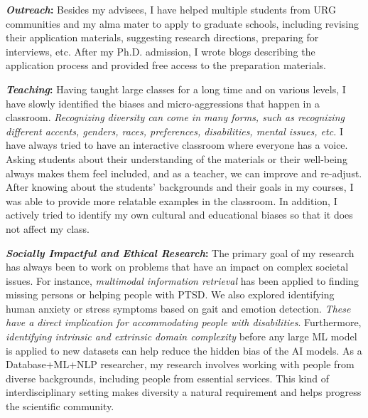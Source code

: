 \documentclass[10pt]{article}
\newcommand*\heading[1]{\textbf{\textit{#1}:}}
\begin{document}
\heading{Outreach} Besides my advisees, I have helped multiple students from URG communities and my alma mater to apply to graduate schools, including revising their application materials, suggesting research directions, preparing for interviews, etc. After my Ph.D. admission, I wrote blogs describing the application process and provided free access to the preparation materials.

\heading{Teaching}
Having taught large classes for a long time and on various levels, I have slowly identified the biases and micro-aggressions that happen in a classroom. 
\textit{Recognizing diversity can come in many forms, such as recognizing different accents, genders, races, preferences, disabilities, mental issues, etc.} I have always tried to have an interactive classroom where everyone has a voice. Asking students about their understanding of the materials or their well-being always makes them feel included, and as a teacher, we can improve and re-adjust. After knowing about the students' backgrounds and their goals in my courses, I was able to provide more relatable examples in the classroom. In addition, I actively tried to identify my own cultural and educational biases so that it does not affect my class.

\heading{Socially Impactful and Ethical Research} 
The primary goal of my research has always been to work on problems that have an impact on complex societal issues. For instance, \textit{multimodal information retrieval} has been applied to finding missing persons or helping people with PTSD. 
We also explored identifying human anxiety or stress symptoms based on gait and emotion detection. \textit{These have a direct implication for accommodating people with disabilities}. Furthermore, \textit{identifying intrinsic and extrinsic domain complexity} before any large ML model is applied to new datasets can help reduce the hidden bias of the AI models.
As a Database+ML+NLP researcher, my research involves working with people from diverse backgrounds, including people from essential services. This kind of interdisciplinary setting makes diversity a natural requirement and helps progress the scientific community. 

\medskip
\end{document}
